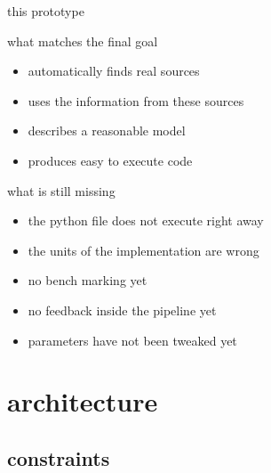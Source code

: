 \documentclass[t,
10pt,
handout, %
]{beamer}
\numberwithin{equation}{section}
\begin{document}
	\begin{frame}[c]{this prototype}
		\bigskip
		\begin{minipage}{0.48 \linewidth}
			\centering
			\begin{exampleblock}{what matches the final goal}
				\begin{itemize}
					\item automatically finds real sources
					\item uses the information from these sources
					\item describes a reasonable model
					\item produces easy to execute code
				\end{itemize}
			\end{exampleblock}
		\end{minipage}
		\hfill%
		\pause
		\begin{minipage}{0.48 \linewidth}
			\centering
			\begin{alertblock}{what is still missing}
				\begin{itemize}
					\item the python file does not execute right away
					\item the units of the implementation are wrong
					\item no bench marking yet
					\item no feedback inside the pipeline yet
					\item parameters have not been tweaked yet
				\end{itemize}
			\end{alertblock}
		\end{minipage}
	\end{frame}
	
	
	\section{architecture}
	
	\subsection{constraints}
	
\end{document}
